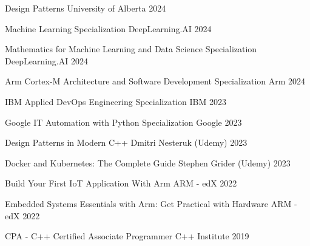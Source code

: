 
\begin{cvhonors}

  \cvhonor
    {Design Patterns} %
    {University of Alberta} %
    {} %
    {2024} %

  \cvhonor
    {Machine Learning Specialization} %
    {DeepLearning.AI} %
    {} %
    {2024} %

  \cvhonor
    {Mathematics for Machine Learning and Data Science Specialization} %
    {DeepLearning.AI} %
    {} %
    {2024} %

  \cvhonor
    {Arm Cortex-M Architecture and Software Development Specialization} %
    {Arm} %
    {} %
    {2024} %

  \cvhonor
    {IBM Applied DevOps Engineering Specialization} %
    {IBM} %
    {} %
    {2023} %

  \cvhonor
    {Google IT Automation with Python Specialization} %
    {Google} %
    {} %
    {2023} %

  \cvhonor
    {Design Patterns in Modern C++} %
    {Dmitri Nesteruk (Udemy)} %
    {} %
    {2023} %

  \cvhonor
    {Docker and Kubernetes: The Complete Guide} %
    {Stephen Grider (Udemy)} %
    {} %
    {2023} %

  \cvhonor
    {Build Your First IoT Application With Arm} %
    {ARM - edX} %
    {} %
    {2022} %

  \cvhonor
    {Embedded Systems Essentials with Arm: Get Practical with Hardware} %
    {ARM - edX} %
    {} %
    {2022} %

  \cvhonor
    {CPA - C++ Certified Associate Programmer} %
    {C++ Institute} %
    {} %
    {2019} %

\end{cvhonors}

